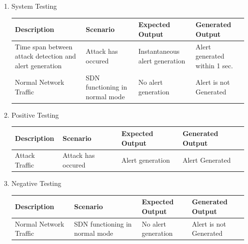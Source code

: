 \documentclass[12pt,a4paper,final]{report}
\begin{document}
\begin{enumerate}
\begin{tabular}{|p{3.5cm}|p{2.9cm}|p{2.5cm}|p{2.5cm}|}
	\end{tabular}
	\linebreak
\newpage	
\item \begin{flushleft}
System Testing 
\end{flushleft} 
	\begin{tabular}{|p{3.5cm}|p{2.9cm}|p{2.5cm}|p{2.5cm}|}
	\hline 
	\textbf{Description} & \textbf{Scenario} & \textbf{Expected Output} & \textbf{Generated 		Output}\\ 
	\hline
	
	Time span between attack detection and alert generation & Attack has occured & Instantaneous alert generation & Alert generated within 1 sec.\\
	\hline
	
	Normal Network Traffic & SDN functioning in normal mode & No alert generation & Alert is not Generated\\
	\hline
	
	\end{tabular}
	
	
\item \begin{flushleft}
Positive Testing 
\end{flushleft} 
	\begin{tabular}{|p{3.5cm}|p{2.9cm}|p{2.5cm}|p{2.5cm}|}
	\hline 
	\textbf{Description} & \textbf{Scenario} & \textbf{Expected Output} & \textbf{Generated 		Output}\\ 
	\hline
	
	Attack Traffic & Attack has occured & Alert generation & Alert Generated\\
	\hline
	
	\end{tabular}
	\linebreak
	
\item \begin{flushleft}
Negative Testing 
\end{flushleft} 
	\begin{tabular}{|p{3.5cm}|p{2.9cm}|p{2.5cm}|p{2.5cm}|}
	\hline 
	\textbf{Description} & \textbf{Scenario} & \textbf{Expected Output} & \textbf{Generated 		Output}\\ 
	\hline
	
	 Normal Network Traffic & SDN functioning in normal mode & No alert generation & Alert is not Generated \\
	 \hline	
	
	\end{tabular}

\end{enumerate}
\end{document}
